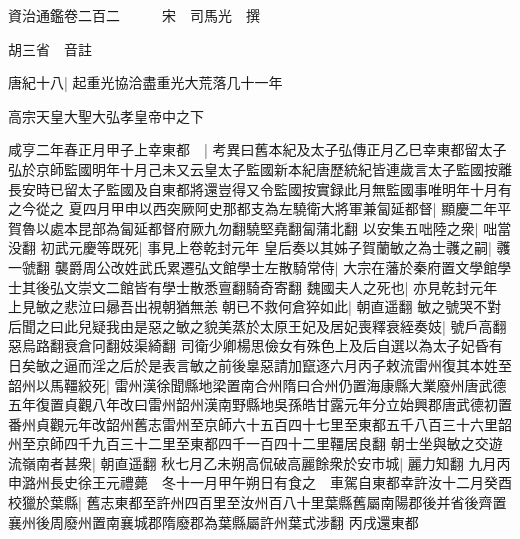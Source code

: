 






























































資治通鑑卷二百二　　　宋　司馬光　撰

胡三省　音註

唐紀十八|{
	起重光協洽盡重光大荒落几十一年}


高宗天皇大聖大弘孝皇帝中之下

咸亨二年春正月甲子上幸東都　|{
	考異曰舊本紀及太子弘傳正月乙巳幸東都留太子弘於京師監國明年十月己未又云皇太子監國新本紀唐歷統紀皆連歲言太子監國按離長安時已留太子監國及自東都將還豈得又令監國按實録此月無監國事唯明年十月有之今從之}
夏四月甲申以西突厥阿史那都支為左驍衛大將軍兼匐延都督|{
	顯慶二年平賀魯以處本昆部為匐延都督府厥九勿翻驍堅堯翻匐蒲北翻}
以安集五咄陸之衆|{
	咄當没翻}
初武元慶等既死|{
	事見上卷乾封元年}
皇后奏以其姊子賀蘭敏之為士彠之嗣|{
	彠一虢翻}
襲爵周公改姓武氏累遷弘文館學士左散騎常侍|{
	大宗在藩於秦府置文學館學士其後弘文崇文二館皆有學士散悉亶翻騎奇寄翻}
魏國夫人之死也|{
	亦見乾封元年}
上見敏之悲泣曰曏吾出視朝猶無恙朝已不救何倉猝如此|{
	朝直遥翻}
敏之號哭不對后聞之曰此兒疑我由是惡之敏之貌美蒸於太原王妃及居妃喪釋衰絰奏妓|{
	號戶高翻惡烏路翻衰倉冋翻妓渠綺翻}
司衛少卿楊思儉女有殊色上及后自選以為太子妃昏有日矣敏之逼而淫之后於是表言敏之前後辠惡請加竄逐六月丙子敕流雷州復其本姓至韶州以馬韁絞死|{
	雷州漢徐聞縣地梁置南合州隋曰合州仍置海康縣大業廢州唐武德五年復置貞觀八年改曰雷州韶州漢南野縣地吳孫皓甘露元年分立始興郡唐武德初置番州貞觀元年改韶州舊志雷州至京師六十五百四十七里至東都五千八百三十六里韶州至京師四千九百三十二里至東都四千一百四十二里韁居良翻}
朝士坐與敏之交遊流嶺南者甚衆|{
	朝直遥翻}
秋七月乙未朔高侃破高麗餘衆於安市城|{
	麗力知翻}
九月丙申潞州長史徐王元禮薨　冬十一月甲午朔日有食之　車駕自東都幸許汝十二月癸酉校獵於葉縣|{
	舊志東都至許州四百里至汝州百八十里葉縣舊屬南陽郡後并省後齊置襄州後周廢州置南襄城郡隋廢郡為葉縣屬許州葉式涉翻}
丙戌還東都

